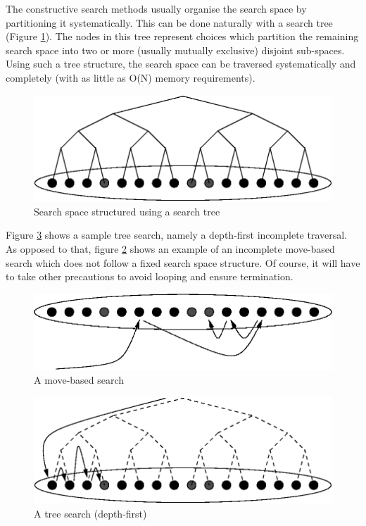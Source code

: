 The constructive search methods usually organise the search space by
partitioning it systematically.  This can be done naturally with a
search tree (Figure \ref{figsearchtree}).  The nodes in this tree
represent choices which partition the remaining search space into two
or more (usually mutually exclusive) disjoint sub-spaces.  Using such
a tree structure, the search space can be traversed systematically and
completely (with as little as O(N) memory requirements).

\begin{figure}
\begin{center}
\includegraphics{search4.eps}
\end{center}
\caption{Search space structured using a search tree}
\label{figsearchtree}
\end{figure}
Figure \ref{figtreesearch} shows a sample tree search, namely a depth-first
incomplete traversal.
As opposed to that, figure \ref{figmovesearch} shows an example of an
incomplete move-based search which does not follow a fixed search space
structure. Of course, it will have to take other precautions to avoid
looping and ensure termination.
\begin{figure}
\begin{center}
\includegraphics{search5.eps}
\end{center}
\caption{A move-based search}
\label{figmovesearch}
\end{figure}

\begin{figure}
\begin{center}
\includegraphics{search6.eps}
\end{center}
\caption{A tree search (depth-first)}
\label{figtreesearch}
\end{figure}

